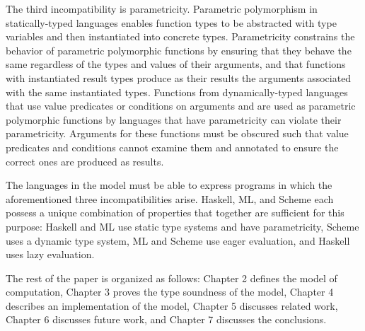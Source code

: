 The third incompatibility is parametricity.  Parametric polymorphism in statically-typed languages enables function types to be abstracted with type variables and then instantiated into concrete types.  Parametricity constrains the behavior of parametric polymorphic functions by ensuring that they behave the same regardless of the types and values of their arguments, and that functions with instantiated result types produce as their results the arguments associated with the same instantiated types.  Functions from dynamically-typed languages that use value predicates or conditions on arguments and are used as parametric polymorphic functions by languages that have parametricity can violate their parametricity.  Arguments for these functions must be obscured such that value predicates and conditions cannot examine them and annotated to ensure the correct ones are produced as results.

The languages in the model must be able to express programs in which the aforementioned three incompatibilities arise.  Haskell, ML, and Scheme each possess a unique combination of properties that together are sufficient for this purpose: Haskell and ML use static type systems and have parametricity, Scheme uses a dynamic type system, ML and Scheme use eager evaluation, and Haskell uses lazy evaluation.

The rest of the paper is organized as follows: Chapter 2 defines the model of computation, Chapter 3 proves the type soundness of the model, Chapter 4 describes an implementation of the model, Chapter 5 discusses related work, Chapter 6 discusses future work, and Chapter 7 discusses the conclusions.